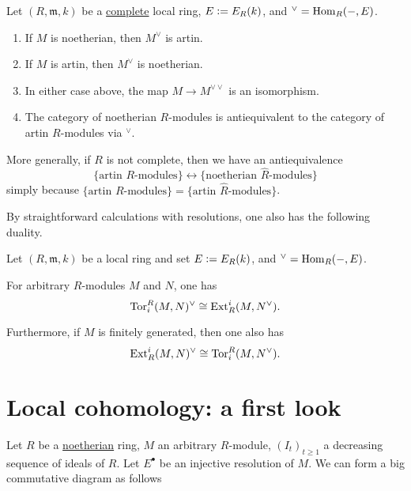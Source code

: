 \documentclass[12pt]{article}
\begin{document}
\begin{thm} \label{thm:matlis-duality}
	Let $(R, \mathfrak{m}, k)$ be a \underline{complete} local ring, $E \vcentcolon= E_{R}(k)$, and $^{\vee} = \operatorname{Hom}_{R}(-, E)$. 
	\begin{enumerate}[label=(\alph*)]
		\item If $M$ is noetherian, then $M^{\vee}$ is artin.
		\item If $M$ is artin, then $M^{\vee}$ is noetherian.
		\item In either case above, the map $M \to M^{\vee \vee}$ is an isomorphism.
		\item The category of noetherian $R$-modules is antiequivalent to the category of artin $R$-modules via $^{\vee}$.
	\end{enumerate}

	More generally, if $R$ is not complete, then we have an antiequivalence
	\begin{equation*} 
		\{\text{artin $R$-modules}\} \leftrightarrow \{\text{noetherian $\widehat{R}$-modules}\}
	\end{equation*}
	simply because $\{\text{artin $R$-modules}\} = \{\text{artin $\hat{R}$-modules}\}$.
\end{thm}

By straightforward calculations with resolutions, one also has the following duality.

\begin{thm}
	Let $(R, \mathfrak{m}, k)$ be a local ring and set $E \vcentcolon= E_{R}(k)$, and $^{\vee} = \operatorname{Hom}_{R}(-, E)$. 

	For arbitrary $R$-modules $M$ and $N$, one has
	\begin{equation*} 
		\operatorname{Tor}^{R}_{i}(M, N)^{\vee} \cong \operatorname{Ext}_{R}^{i}(M, N^{\vee}).
	\end{equation*}

	Furthermore, if $M$ is finitely generated, then one also has
	\begin{equation*} 
		\operatorname{Ext}_{R}^{i}(M, N)^{\vee} \cong \operatorname{Tor}^{R}_{i}(M, N^{\vee}).
	\end{equation*}
\end{thm}

\newpage

\section{Local cohomology: a first look}

Let $R$ be a \underline{noetherian} ring, $M$ an arbitrary $R$-module, $(I_{t})_{t \ge 1}$ a decreasing sequence of ideals of $R$. Let $E^{\bullet}$ be an injective resolution of $M$. We can form a big commutative diagram as follows
\end{document}
